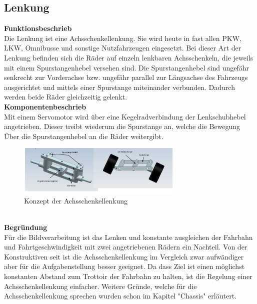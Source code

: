 \subsection{Lenkung}

\textbf{Funktionsbeschrieb}
\\[0.2cm]
Die Lenkung ist eine Achsschenkellenkung. Sie wird heute in fast allen PKW, LKW, Omnibusse und sonstige Nutzfahrzeugen eingesetzt. Bei dieser Art der Lenkung befinden sich die Räder auf einzeln lenkbaren Achsschenkeln, die jeweils mit einem Spurstangenhebel versehen sind. Die Spurstangenhebel sind ungefähr senkrecht zur Vorderachse bzw. ungefähr parallel zur Längsachse des Fahrzeugs ausgerichtet und mittels einer Spurstange miteinander verbunden. Dadurch werden beide Räder gleichzeitig gelenkt.\\[0.2cm]
\textbf{Komponentenbeschrieb}
\\[0.2cm]
Mit einem Servomotor wird über eine Kegelradverbindung der Lenkschubhebel angetrieben. Dieser treibt wiederum die Spurstange an, welche die Bewegung Über die Spurstangenhebel an die Räder weitergibt.\\[0.2cm]
\begin{figure}[h!]%
\centering
\includegraphics[width=0.7\textwidth]{03_Loesungskonzept/pictures/Achsschenkellenkung.JPG}
\caption{Konzept der Achsschenkellenkung}
\label{fig:activityRoute}
\end{figure}\\
\textbf{Begründung}
\\[0.2cm]
Für die Bildverarbeitung ist das Lenken und konstante ausgleichen der Fahrbahn und Fahrtgeschwindigkeit mit zwei angetriebenen Rädern ein Nachteil. Von der Konstruktiven seit ist die Achsschenkellenkung im Vergleich zwar aufwändiger aber für die Aufgabenstellung besser geeignet. Da dass Ziel ist einen möglichst konstanten Abstand zum Trottoir der Fahrbahn zu halten, ist die Regelung einer Achsschenkellenkung einfacher. Weitere Gründe, welche für die Achsschenkellenkung sprechen wurden schon im Kapitel "Chassis" erläutert.
